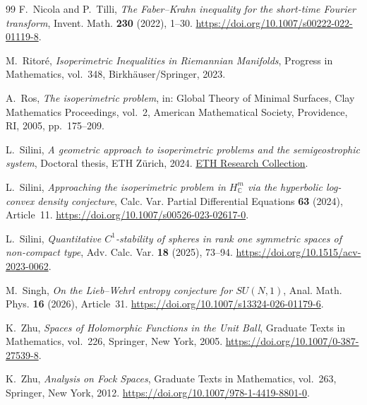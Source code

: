 \documentclass[11pt,reqno]{amsart}
\numberwithin{equation}{section}
\theoremstyle{definition}
\theoremstyle{remark}
\begin{document}
\begin{thebibliography}{99}
F.~Nicola and P.~Tilli,
\emph{The Faber--Krahn inequality for the short-time Fourier transform},
Invent. Math. \textbf{230} (2022), 1--30.
\url{https://doi.org/10.1007/s00222-022-01119-8}.

M.~Ritor\'e,
\emph{Isoperimetric Inequalities in Riemannian Manifolds},
Progress in Mathematics, vol.~348,
Birkh\"auser/Springer, 2023.

A.~Ros,
\emph{The isoperimetric problem},
in: Global Theory of Minimal Surfaces,
Clay Mathematics Proceedings, vol.~2,
American Mathematical Society, Providence, RI, 2005,
pp.~175--209.

L.~Silini,
\emph{A geometric approach to isoperimetric problems and the
semigeostrophic system},
Doctoral thesis, ETH Z\"urich, 2024.
\href{https://www.research-collection.ethz.ch/bitstreams/2e247fd0-a175-4ba3-9017-38dc49a51932/download}
{ETH Research Collection}.

L.~Silini,
\emph{Approaching the isoperimetric problem in
\(H_{\mathbb C}^{m}\) via the hyperbolic log-convex density conjecture},
Calc. Var. Partial Differential Equations
\textbf{63} (2024), Article~11.
\url{https://doi.org/10.1007/s00526-023-02617-0}.

L.~Silini,
\emph{Quantitative \(C^1\)-stability of spheres in rank one symmetric
spaces of non-compact type},
Adv. Calc. Var. \textbf{18} (2025), 73--94.
\url{https://doi.org/10.1515/acv-2023-0062}.

M.~Singh,
\emph{On the Lieb--Wehrl entropy conjecture for \(SU(N,1)\)},
Anal. Math. Phys. \textbf{16} (2026), Article~31.
\url{https://doi.org/10.1007/s13324-026-01179-6}.


K.~Zhu,
\emph{Spaces of Holomorphic Functions in the Unit Ball},
Graduate Texts in Mathematics, vol.~226,
Springer, New York, 2005.
\url{https://doi.org/10.1007/0-387-27539-8}.

K.~Zhu,
\emph{Analysis on Fock Spaces},
Graduate Texts in Mathematics, vol.~263,
Springer, New York, 2012.
\url{https://doi.org/10.1007/978-1-4419-8801-0}.

\end{thebibliography}
\end{document}
